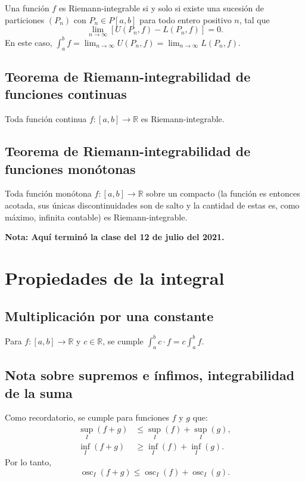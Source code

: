 \documentclass{article}
\DeclareMathOperator{\osc}{osc}
\begin{document}
Una función $f$ es Riemann-integrable si y solo si existe una sucesión de particiones $(P_n)$ con $P_n\in P[a,b]$ para todo entero positivo $n$, tal que
$$\lim_{n\to\infty}\left[U(P_n,f)-L(P_n,f)\right]=0.$$
En este caso, $\displaystyle\int_a^b f=\lim_{n\to\infty}U(P_n,f)=\lim_{n\to\infty}L(P_n,f)$.

\subsection*{Teorema de Riemann-integrabilidad de funciones continuas}

Toda función continua $f:[a,b]\to\mathbb{R}$ es Riemann-integrable.

\subsection*{Teorema de Riemann-integrabilidad de funciones monótonas}

Toda función monótona $f:[a,b]\to\mathbb{R}$ sobre un compacto (la función es entonces acotada, sus únicas discontinuidades son de salto y la cantidad de estas es, como máximo, infinita contable) es Riemann-integrable.

\vspace{10pt}
\textbf{Nota: Aquí terminó la clase del 12 de julio del 2021.}
\newpage

\section*{Propiedades de la integral}

\subsection*{Multiplicación por una constante}

Para $f:[a,b]\to\mathbb{R}$ y $c\in\mathbb{R}$, se cumple $\displaystyle\int_a^b c\cdot f=c\int_a^b f$. 

\subsection*{Nota sobre supremos e ínfimos, integrabilidad de la suma}

Como recordatorio, se cumple para funciones $f$ y $g$ que:
\begin{align*}
\sup_I(f+g)&\leq \sup_I(f)+\sup_I(g),\\
\inf_I(f+g)&\geq \inf_I(f)+\inf_I(g).
\end{align*}
Por lo tanto,
$$\osc_I(f+g)\leq \osc_I(f)+\osc_I(g).$$
\end{document}
